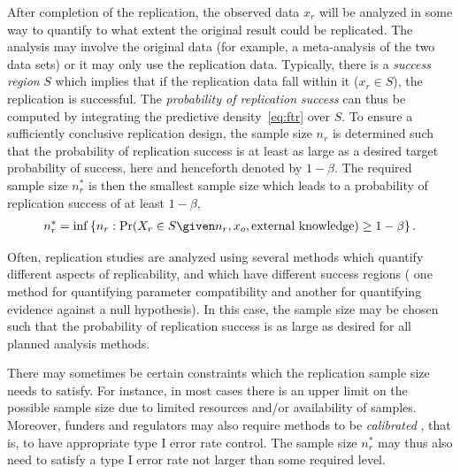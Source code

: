 After completion of the replication, the observed data $x_r$ will be analyzed in
some way to quantify to what extent the original result could be replicated. The
analysis may involve the original data (for example, a meta-analysis of the two
data sets) or it may only use the replication data. Typically, there is a
\emph{success region} $S$ which implies that if the replication data fall within
it ($x_r \in S$), the replication is successful. The \emph{probability of
  replication success} can thus be computed by integrating the predictive
density~\eqref{eq:ftr} over $S$. To ensure a sufficiently conclusive replication
design, the sample size $n_{r}$ is determined such that the probability of
replication success is at least as large as a desired target probability of
success, here and henceforth denoted by $1 - \beta$. The required sample size
$n_r^*$ is then the smallest sample size which leads to a probability of
replication success of at least $1 - \beta$, \ie{}
\begin{align}
  \label{eq:nr}
  n_r^* = \inf \left\{n_r : \Pr(X_{r} \in S \given
  n_r, x_{o}, \text{external knowledge}) \geq 1 - \beta \right\}.
\end{align}

Often, replication studies are analyzed using several methods which quantify
different aspects of replicability, and which have different success regions
(\eg{} one method for quantifying parameter compatibility and another for
quantifying evidence against a null hypothesis). In this case, the sample size
may be chosen such that the probability of replication success is as large as
desired for all planned analysis methods.

There may sometimes be certain constraints which the replication sample size
needs to satisfy. For instance, in most cases there is an upper limit on the
possible sample size due to limited resources and/or availability of samples.
Moreover, funders and regulators may also require methods to be
\emph{calibrated} \citep{Grieve2016}, that is, to have appropriate type I error
rate control. The sample size $n_r^*$ may thus also need to satisfy a type I
error rate not larger than some required level.






